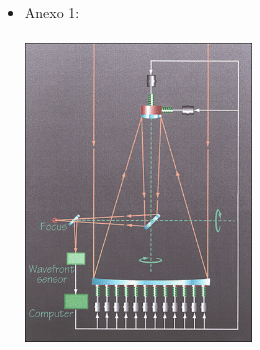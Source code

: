 
\begin{itemize}
    \item Anexo 1:
        \\
        \vspace{3.5cm}
        \includegraphics[width=6cm,height=9cm]{figures/actopt2.jpg} \\
        \vspace{3.5cm}
\end{itemize}

